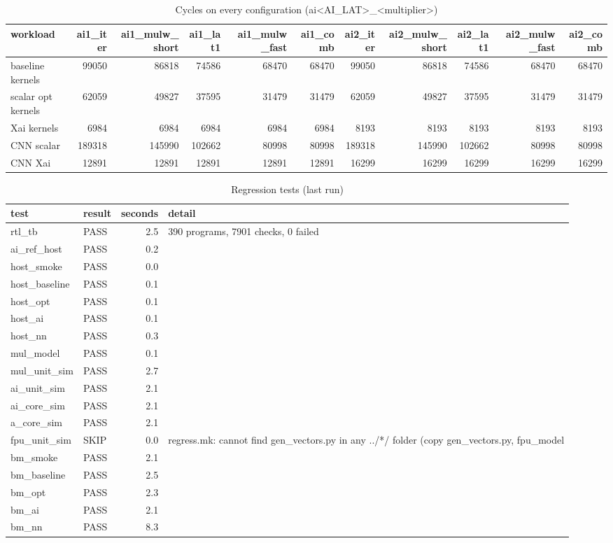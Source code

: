 \begin{table}[t]
\centering
\caption{Cycles on every configuration (ai<AI\_LAT>\_<multiplier>)}
\label{tab:config_cycles}
\begin{tabular}{lrrrrrrrrrr}
\toprule
workload & ai1\_iter & ai1\_mulw\_short & ai1\_lat1 & ai1\_mulw\_fast & ai1\_comb & ai2\_iter & ai2\_mulw\_short & ai2\_lat1 & ai2\_mulw\_fast & ai2\_comb \\
\midrule
baseline kernels & 99050 & 86818 & 74586 & 68470 & 68470 & 99050 & 86818 & 74586 & 68470 & 68470 \\
scalar opt kernels & 62059 & 49827 & 37595 & 31479 & 31479 & 62059 & 49827 & 37595 & 31479 & 31479 \\
Xai kernels & 6984 & 6984 & 6984 & 6984 & 6984 & 8193 & 8193 & 8193 & 8193 & 8193 \\
CNN scalar & 189318 & 145990 & 102662 & 80998 & 80998 & 189318 & 145990 & 102662 & 80998 & 80998 \\
CNN Xai & 12891 & 12891 & 12891 & 12891 & 12891 & 16299 & 16299 & 16299 & 16299 & 16299 \\
\bottomrule
\end{tabular}
\end{table}

\begin{table}[t]
\centering
\caption{Regression tests (last run)}
\label{tab:verification}
\begin{tabular}{llrl}
\toprule
test & result & seconds & detail \\
\midrule
rtl\_tb & PASS & 2.5 & 390 programs, 7901 checks, 0 failed \\
ai\_ref\_host & PASS & 0.2 &  \\
host\_smoke & PASS & 0.0 &  \\
host\_baseline & PASS & 0.1 &  \\
host\_opt & PASS & 0.1 &  \\
host\_ai & PASS & 0.1 &  \\
host\_nn & PASS & 0.3 &  \\
mul\_model & PASS & 0.1 &  \\
mul\_unit\_sim & PASS & 2.7 &  \\
ai\_unit\_sim & PASS & 2.1 &  \\
ai\_core\_sim & PASS & 2.1 &  \\
a\_core\_sim & PASS & 2.1 &  \\
fpu\_unit\_sim & SKIP & 0.0 & regress.mk: cannot find gen\_vectors.py in any ../*/ folder (copy gen\_vectors.py, fpu\_model \\
bm\_smoke & PASS & 2.1 &  \\
bm\_baseline & PASS & 2.5 &  \\
bm\_opt & PASS & 2.3 &  \\
bm\_ai & PASS & 2.1 &  \\
bm\_nn & PASS & 8.3 &  \\
\bottomrule
\end{tabular}
\end{table}
